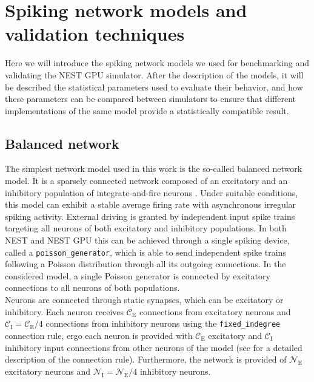 \documentclass[a4paper, 12pt, twoside, openright]{book}
\begin{document}
\chapter{\textbf{Spiking network models and validation techniques}}
\label{chapter:models_and_validation}

\begin{tcolorbox}[colback=white,colframe=DarkRed,title=\textbf{Summary}]
Here we will introduce the spiking network models we used for benchmarking and validating the NEST GPU simulator.
After the description of the models, it will be described the statistical parameters used to evaluate their behavior, and how these parameters can be compared between simulators to ensure that different implementations of the same model provide a statistically compatible result.
\end{tcolorbox}

\section{Balanced network}
\label{sec:balanced_network}
The simplest network model used in this work is the so-called balanced network model. It is a sparsely connected network composed of an excitatory and an inhibitory population of integrate-and-fire neurons \cite{Brunel2000}. Under suitable conditions, this model can exhibit a stable average firing rate with asynchronous irregular spiking activity. External driving is granted by independent input spike trains targeting all neurons of both excitatory and inhibitory populations. In both NEST and NEST GPU this can be achieved through a single spiking device, called a \texttt{poisson\_generator}, which is able to send independent spike trains following a Poisson distribution through all its outgoing connections. In the considered model, a single Poisson generator is connected by excitatory connections to all neurons of both populations.\\
Neurons are connected through static synapses, which can be excitatory or inhibitory. Each neuron receives $\mathcal{C}_{\text{E}}$ connections from excitatory neurons and $\mathcal{C}_{\text{I}}=\mathcal{C}_{\text{E}}/4$ connections from inhibitory neurons using the \texttt{fixed\_indegree} connection rule, ergo each neuron is provided with $\mathcal{C}_{\text{E}}$ excitatory and $\mathcal{C}_{\text{I}}$ inhibitory input connections from other neurons of the model (see \cite{Senk2022} for a detailed description of the connection rule). Furthermore, the network is provided of $\mathcal{N}_{\text{E}}$ excitatory neurons and $\mathcal{N}_{\text{I}}=\mathcal{N}_{\text{E}}/4$ inhibitory neurons.
\end{document}
